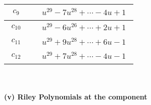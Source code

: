 \documentclass[1p]{elsarticle_modified}
\theoremstyle{definition}
\begin{document}
\begin{tabular}{m{50pt}|m{274pt}}
\hline $$\begin{aligned}c_{9}\end{aligned}$$&$\begin{aligned}
&u^{29}-7 u^{28}+\cdots-4 u+1
\end{aligned}$\\
\hline $$\begin{aligned}c_{10}\end{aligned}$$&$\begin{aligned}
&u^{29}-6 u^{26}+\cdots+2 u+1
\end{aligned}$\\
\hline $$\begin{aligned}c_{11}\end{aligned}$$&$\begin{aligned}
&u^{29}+9 u^{28}+\cdots+6 u-1
\end{aligned}$\\
\hline $$\begin{aligned}c_{12}\end{aligned}$$&$\begin{aligned}
&u^{29}+7 u^{28}+\cdots-4 u-1
\end{aligned}$\\
\hline
\end{tabular}\\~\\
\newpage\renewcommand{\arraystretch}{1}
\flushleft \textbf{(v) Riley Polynomials at the component}\newline \\
\end{document}
